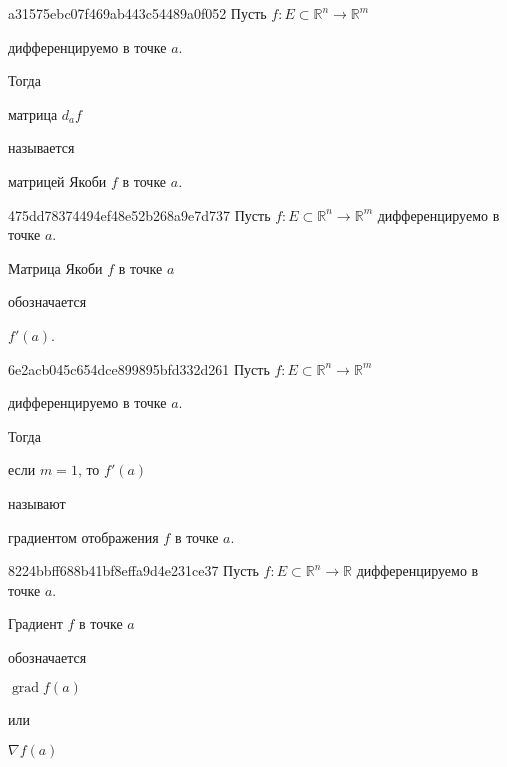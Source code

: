 \begin{note}{a31575ebc07f469ab443c54489a0f052}
    Пусть \({ f : E \subset \mathbb R^{n} \to \mathbb R^{m} }\) \begin{icloze}{3}дифференцируемо в точке \({ a }\).\end{icloze}
    Тогда \begin{icloze}{1}матрица \({ d_{a}f }\)\end{icloze} называется \begin{icloze}{2}матрицей Якоби \({ f }\) в точке \({ a }\).\end{icloze}
\end{note}

\begin{note}{475dd78374494ef48e52b268a9e7d737}
    Пусть \({ f : E \subset \mathbb R^{n} \to \mathbb R^{m} }\) дифференцируемо в точке \({ a }\).
    \begin{icloze}{2}Матрица Якоби \({ f }\) в точке \({ a }\)\end{icloze} обозначается \begin{icloze}{1}\({ f'(a) }\).\end{icloze}
\end{note}

\begin{note}{6e2acb045c654dce899895bfd332d261}
    Пусть \({ f : E \subset \mathbb R^{n} \to \mathbb R^{m} }\) \begin{icloze}{3}дифференцируемо в точке \({ a }\).\end{icloze}
    Тогда \begin{icloze}{1}если \({ m = 1 }\), то \({ f'(a) }\)\end{icloze} называют \begin{icloze}{2}градиентом отображения \({ f }\) в точке \({ a }\).\end{icloze}
\end{note}

\begin{note}{8224bbff688b41bf8effa9d4e231ce37}
    Пусть \({ f : E \subset \mathbb R^{n} \to \mathbb R }\) дифференцируемо в точке \({ a }\).
    \begin{icloze}{2}Градиент \({ f }\) в точке \({ a }\)\end{icloze} обозначается \begin{icloze}{1}\({ \operatorname{grad} f(a) }\)\end{icloze} или \begin{icloze}{1}\({ \nabla f(a) }\)\end{icloze}
\end{note}

